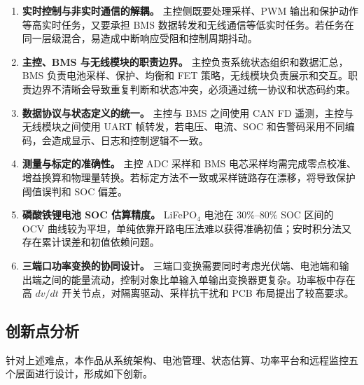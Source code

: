 \begin{enumerate}[label=\arabic*、, leftmargin=*, itemsep=0.8ex, parsep=0pt, topsep=0.5ex]
  \item \textbf{实时控制与非实时通信的解耦。}
  主控侧既要处理采样、PWM 输出和保护动作等高实时任务，又要承担 BMS 数据转发和无线通信等低实时任务。若任务在同一层级混合，易造成中断响应受阻和控制周期抖动。

  \item \textbf{主控、BMS 与无线模块的职责边界。}
  主控负责系统状态组织和数据汇总，BMS 负责电池采样、保护、均衡和 FET 策略，无线模块负责展示和交互。职责边界不清晰会导致重复判断和状态冲突，必须通过统一协议和状态码约束。

  \item \textbf{数据协议与状态定义的统一。}
  主控与 BMS 之间使用 CAN FD 遥测，主控与无线模块之间使用 UART 帧转发，若电压、电流、SOC 和告警码采用不同编码，会造成显示、日志和控制逻辑不一致。

  \item \textbf{测量与标定的准确性。}
  主控 ADC 采样和 BMS 电芯采样均需完成零点校准、增益换算和物理量转换。若标定方法不一致或采样链路存在漂移，将导致保护阈值误判和 SOC 偏差。

  \item \textbf{磷酸铁锂电池 SOC 估算精度。}
  LiFePO$_4$ 电池在 $30\%$--$80\%$ SOC 区间的 OCV 曲线较为平坦，单纯依靠开路电压法难以获得准确初值；安时积分法又存在累计误差和初值依赖问题。

  \item \textbf{三端口功率变换的协同设计。}
  三端口变换需要同时考虑光伏端、电池端和输出端之间的能量流动，控制对象比单输入单输出变换器更复杂。功率板中存在高 $dv/dt$ 开关节点，对隔离驱动、采样抗干扰和 PCB 布局提出了较高要求。
\end{enumerate}

\subsection{创新点分析}

针对上述难点，本作品从系统架构、电池管理、状态估算、功率平台和远程监控五个层面进行设计，形成如下创新。

